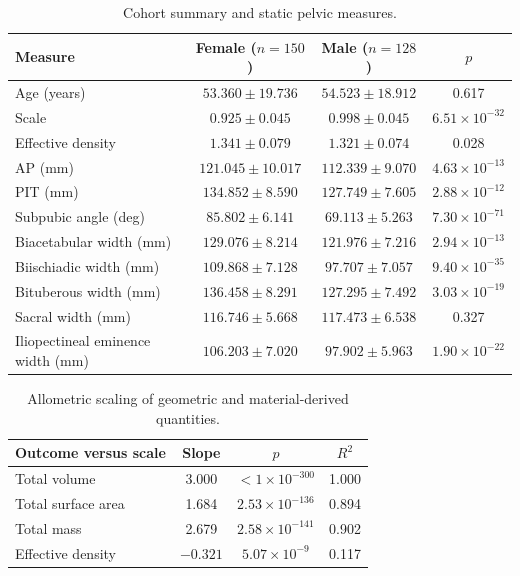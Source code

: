 \documentclass[openacc]{rsproca_new}
\begin{document}
\begin{table}[p]
\centering
\caption{Cohort summary and static pelvic measures.}
\label{tab:cohort}
\begin{tabular}{lccc}
\toprule
Measure & Female ($n=150$) & Male ($n=128$) & $p$ \\
\midrule
Age (years) & $53.360 \pm 19.736$ & $54.523 \pm 18.912$ & 0.617 \\
Scale & $0.925 \pm 0.045$ & $0.998 \pm 0.045$ & $6.51 \times 10^{-32}$ \\
Effective density & $1.341 \pm 0.079$ & $1.321 \pm 0.074$ & 0.028 \\
AP (mm) & $121.045 \pm 10.017$ & $112.339 \pm 9.070$ & $4.63 \times 10^{-13}$ \\
PIT (mm) & $134.852 \pm 8.590$ & $127.749 \pm 7.605$ & $2.88 \times 10^{-12}$ \\
Subpubic angle (deg) & $85.802 \pm 6.141$ & $69.113 \pm 5.263$ & $7.30 \times 10^{-71}$ \\
Biacetabular width (mm) & $129.076 \pm 8.214$ & $121.976 \pm 7.216$ & $2.94 \times 10^{-13}$ \\
Biischiadic width (mm) & $109.868 \pm 7.128$ & $97.707 \pm 7.057$ & $9.40 \times 10^{-35}$ \\
Bituberous width (mm) & $136.458 \pm 8.291$ & $127.295 \pm 7.492$ & $3.03 \times 10^{-19}$ \\
Sacral width (mm) & $116.746 \pm 5.668$ & $117.473 \pm 6.538$ & 0.327 \\
Iliopectineal eminence width (mm) & $106.203 \pm 7.020$ & $97.902 \pm 5.963$ & $1.90 \times 10^{-22}$ \\
\bottomrule
\end{tabular}
\end{table}

\begin{table}[p]
\centering
\caption{Allometric scaling of geometric and material-derived quantities.}
\label{tab:allometry}
\begin{tabular}{lccc}
\toprule
Outcome versus scale & Slope & $p$ & $R^2$ \\
\midrule
Total volume & 3.000 & $< 1 \times 10^{-300}$ & 1.000 \\
Total surface area & 1.684 & $2.53 \times 10^{-136}$ & 0.894 \\
Total mass & 2.679 & $2.58 \times 10^{-141}$ & 0.902 \\
Effective density & $-0.321$ & $5.07 \times 10^{-9}$ & 0.117 \\
\bottomrule
\end{tabular}
\end{table}
\end{document}
